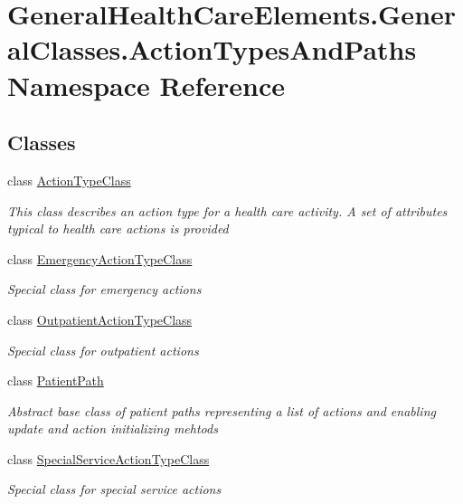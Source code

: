 \hypertarget{namespace_general_health_care_elements_1_1_general_classes_1_1_action_types_and_paths}{}\section{General\+Health\+Care\+Elements.\+General\+Classes.\+Action\+Types\+And\+Paths Namespace Reference}
\label{namespace_general_health_care_elements_1_1_general_classes_1_1_action_types_and_paths}
\subsection*{Classes}
\begin{DoxyCompactItemize}
\item 
class \hyperlink{class_general_health_care_elements_1_1_general_classes_1_1_action_types_and_paths_1_1_action_type_class}{Action\+Type\+Class}
\begin{DoxyCompactList}\small\item\em This class describes an action type for a health care activity. A set of attributes typical to health care actions is provided \end{DoxyCompactList}\item 
class \hyperlink{class_general_health_care_elements_1_1_general_classes_1_1_action_types_and_paths_1_1_emergency_action_type_class}{Emergency\+Action\+Type\+Class}
\begin{DoxyCompactList}\small\item\em Special class for emergency actions \end{DoxyCompactList}\item 
class \hyperlink{class_general_health_care_elements_1_1_general_classes_1_1_action_types_and_paths_1_1_outpatient_action_type_class}{Outpatient\+Action\+Type\+Class}
\begin{DoxyCompactList}\small\item\em Special class for outpatient actions \end{DoxyCompactList}\item 
class \hyperlink{class_general_health_care_elements_1_1_general_classes_1_1_action_types_and_paths_1_1_patient_path}{Patient\+Path}
\begin{DoxyCompactList}\small\item\em Abstract base class of patient paths representing a list of actions and enabling update and action initializing mehtods \end{DoxyCompactList}\item 
class \hyperlink{class_general_health_care_elements_1_1_general_classes_1_1_action_types_and_paths_1_1_special_service_action_type_class}{Special\+Service\+Action\+Type\+Class}
\begin{DoxyCompactList}\small\item\em Special class for special service actions \end{DoxyCompactList}\end{DoxyCompactItemize}
